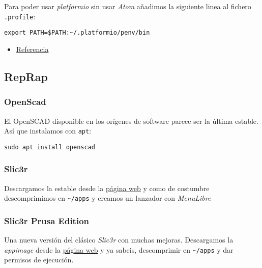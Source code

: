 \documentclass[
  12pt,
  spanish,
]{article}
\providecommand{\tightlist}{%
  \setlength{\itemsep}{0pt}\setlength{\parskip}{0pt}}
\begin{document}
Para poder usar \emph{platformio} sin usar \emph{Atom} añadimos la
siguiente linea al fichero \texttt{.profile}:

\begin{verbatim}
export PATH=$PATH:~/.platformio/penv/bin
\end{verbatim}

\begin{itemize}
\tightlist
\item
  \href{https://docs.platformio.org/en/latest/installation.html\#piocore-install-shell-commands}{Referencia}
\end{itemize}

\hypertarget{reprap}{%
\subsection{RepRap}\label{reprap}}

\hypertarget{openscad}{%
\subsubsection{OpenScad}\label{openscad}}

El OpenSCAD disponible en los orígenes de software parece ser la última
estable. Así que instalamos con \texttt{apt}:

\begin{verbatim}
sudo apt install openscad
\end{verbatim}

\hypertarget{slic3r}{%
\subsubsection{Slic3r}\label{slic3r}}

Descargamos la estable desde la \href{https://dl.slic3r.org}{página web}
y como de costumbre descomprimimos en \texttt{\textasciitilde{}/apps} y
creamos un lanzador con \emph{MenuLibre}

\hypertarget{slic3r-prusa-edition}{%
\subsubsection{Slic3r Prusa Edition}\label{slic3r-prusa-edition}}

Una nueva versión del clásico \emph{Slic3r} con muchas mejoras.
Descargamos la \emph{appimage} desde la
\href{https://www.prusa3d.com/slic3r-prusa-edition/}{página web} y ya
sabeis, descomprimir en \texttt{\textasciitilde{}/apps} y dar permisos
de ejecución.
\end{document}
